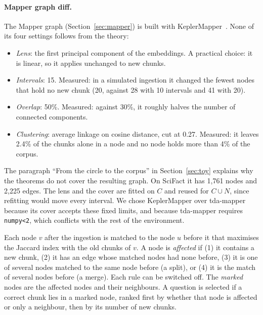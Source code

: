 \paragraph{Mapper graph diff.}
The Mapper graph (Section~\ref{sec:mapper}) is built with
KeplerMapper~\cite{vanveen2019kepler}. None of its four settings follows
from the theory:
\begin{itemize}
  \item \emph{Lens}: the first principal component of the embeddings. A
    practical choice: it is linear, so it applies unchanged to new chunks.
  \item \emph{Intervals}: 15. Measured: in a simulated ingestion it changed
    the fewest nodes that hold no new chunk (20, against 28 with 10
    intervals and 41 with 20).
  \item \emph{Overlap}: 50\%. Measured: against 30\%, it roughly halves the
    number of connected components.
  \item \emph{Clustering}: average linkage on cosine distance, cut at 0.27.
    Measured: it leaves 2.4\% of the chunks alone in a node and no node
    holds more than 4\% of the corpus.
\end{itemize}
The paragraph ``From the circle to the corpus'' in Section~\ref{sec:toy}
explains why the theorems do not cover the resulting graph. On SciFact it
has 1,761 nodes and 2,225 edges. The lens and the cover are fitted on $C$
and reused for $C \cup N$, since refitting would move every interval. We
chose KeplerMapper over tda-mapper~\cite{simi2025tdamapper} because its
cover accepts these fixed limits, and because tda-mapper requires
\texttt{numpy<2}, which conflicts with the rest of the environment.

Each node $v$ after the ingestion is matched to the node $u$ before it that
maximises the Jaccard index with the old chunks of $v$. A node is
\emph{affected} if (1) it contains a new chunk, (2) it has an edge whose
matched nodes had none before, (3) it is one of several nodes matched to the
same node before (a split), or (4) it is the match of several nodes before
(a merge). Each rule can be switched off. The \emph{marked} nodes are the
affected nodes and their neighbours. A question is selected if a correct
chunk lies in a marked node, ranked first by whether that node is affected
or only a neighbour, then by its number of new chunks.

